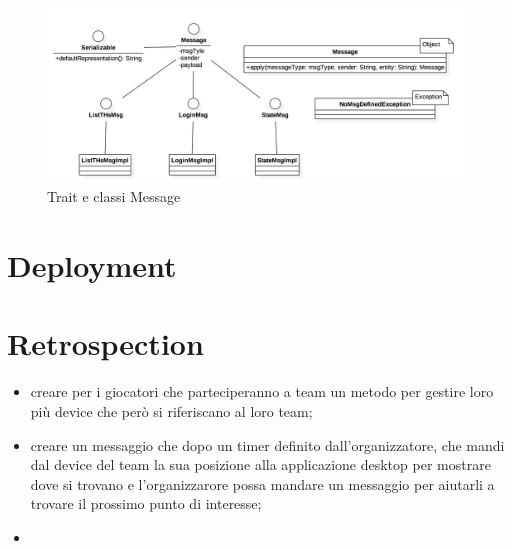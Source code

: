 \documentclass[12pt, italian]{article}
\begin{document}
\begin{figure}[H]
	\centering
	\includegraphics[width=1\textwidth]{img/diagram02.png}
	\caption{Trait e classi Message}
\end{figure}

\section{Deployment}
\section{Retrospection}
\begin{itemize}
	\item creare per i giocatori che parteciperanno a team un metodo per gestire loro più device che però si riferiscano al loro team;
	\item creare un messaggio che dopo un timer definito dall'organizzatore, che mandi dal device del team la sua posizione alla applicazione desktop per mostrare dove si trovano e l'organizzarore possa mandare un messaggio per aiutarli a trovare il prossimo punto di interesse;
	\item 
\end{itemize}
\vspace{-30pt}
\end{document}
